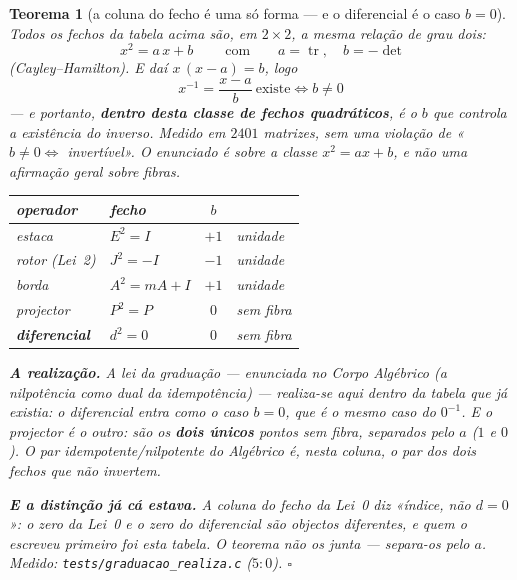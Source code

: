 \documentclass[11pt,a4paper]{article}
\newtheorem{teorema}{Teorema}
\newcommand{\code}[1]{\texttt{#1}}
\begin{document}
\begin{teorema}[a coluna do fecho é uma só forma --- e o diferencial é o
caso $b=0$]\label{thm:fecho-b}
Todos os fechos da tabela acima são, em $2\times2$, a \emph{mesma}
relação de grau dois:
\[
\boxed{\;x^{2}=a\,x+b\;}
\qquad\text{com}\qquad
a=\operatorname{tr},\quad b=-\det
\]
(Cayley--Hamilton). E daí $x\,(x-a)=b$, logo
\[
\boxed{\;x^{-1}=\frac{x-a}{b}\ \text{existe}\iff b\neq0\;}
\]
--- e portanto, \textbf{dentro desta classe de fechos quadráticos}, é o
$b$ que controla a existência do inverso. Medido em $2401$ matrizes,
sem uma violação de «$b\neq0\iff$ invertível». \emph{O enunciado é
sobre a classe $x^{2}=ax+b$, e não uma afirmação geral sobre fibras.}
\begin{center}\small
\begin{tabular}{@{}llcl@{}}
\toprule
operador & fecho & $b$ & \\
\midrule
estaca & $E^{2}=I$ & $+1$ & unidade \\
rotor (Lei~2) & $J^{2}=-I$ & $-1$ & unidade \\
borda & $A^{2}=mA+I$ & $+1$ & unidade \\
projector & $P^{2}=P$ & $0$ & \emph{sem fibra} \\
\textbf{diferencial} & $d^{2}=0$ & $0$ & \emph{sem fibra} \\
\bottomrule
\end{tabular}
\end{center}
\noindent \textbf{A realização.} A lei da graduação --- enunciada no
\emph{Corpo Algébrico} (a nilpotência como dual da idempotência) ---
realiza-se aqui \emph{dentro da tabela que já existia}: o diferencial
entra como o caso $b=0$, que é o mesmo caso do $0^{-1}$. E o projector
é o outro: são os \textbf{dois únicos} pontos sem fibra, separados pelo
$a$ ($1$ e $0$). O par idempotente/nilpotente do Algébrico é, nesta
coluna, o par dos dois fechos que não invertem.

\noindent \textbf{E a distinção já cá estava.} A coluna do fecho da
Lei~0 diz «índice, \emph{não} $d=0$»: o zero da Lei~0 e o zero do
diferencial são objectos diferentes, e quem o escreveu primeiro foi
esta tabela. O teorema não os junta --- separa-os pelo $a$.
\emph{Medido:} \code{tests/graduacao\_realiza.c} ($5{:}0$).
$\square$
\end{teorema}
\end{document}
